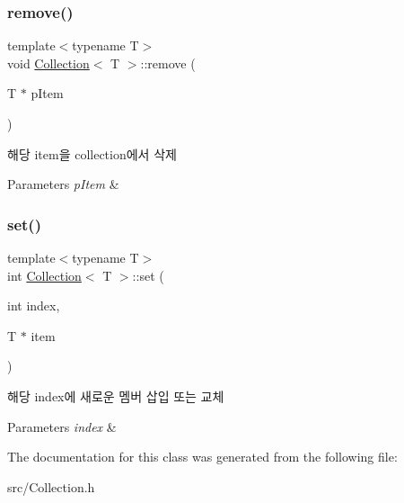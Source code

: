 \subsubsection{\texorpdfstring{remove()}{remove()}\hspace{0.1cm}{\footnotesize\ttfamily [2/2]}}
{\footnotesize\ttfamily template$<$typename T$>$ \\
void \mbox{\hyperlink{class_collection}{Collection}}$<$ T $>$\+::remove (\begin{DoxyParamCaption}\item[{T $\ast$}]{p\+Item }\end{DoxyParamCaption})}

해당 item을 collection에서 삭제 
\begin{DoxyParams}{Parameters}
{\em p\+Item} & \\
\hline
\end{DoxyParams}
\mbox{\label{class_collection_a172de5b961f68075b07ce17c4dc79d94}} 
\subsubsection{\texorpdfstring{set()}{set()}}
{\footnotesize\ttfamily template$<$typename T$>$ \\
int \mbox{\hyperlink{class_collection}{Collection}}$<$ T $>$\+::set (\begin{DoxyParamCaption}\item[{int}]{index,  }\item[{T $\ast$}]{item }\end{DoxyParamCaption})}

해당 index에 새로운 멤버 삽입 또는 교체 
\begin{DoxyParams}{Parameters}
{\em index} & \\
\hline
\end{DoxyParams}


The documentation for this class was generated from the following file\+:\begin{DoxyCompactItemize}
\item 
src/Collection.\+h\end{DoxyCompactItemize}
